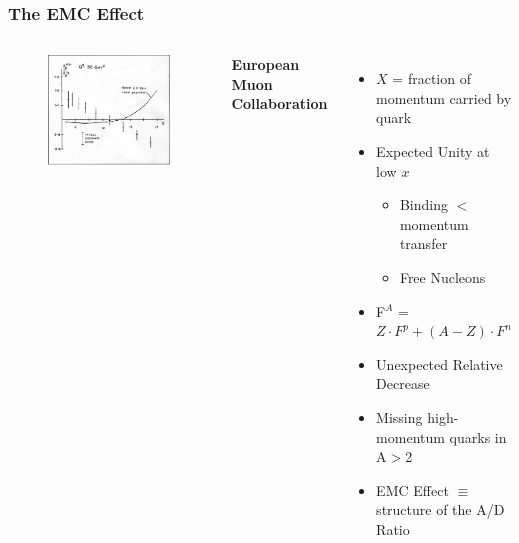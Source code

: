 \documentclass[12pt,usenames,dvipsnames]{beamer}
\begin{document}
\begin{frame}
\frametitle{The EMC Effect}
\begin{columns}[t]
	\vspace{-35pt}
	\begin{figure}
		\includegraphics[width =7cm]{../images/Thesis/EMC.png}
		\caption*{\cite{cc}}
	\end{figure}
	
	\vspace{-1.25cm}	\hspace{-20pt}\textbf{ European Muon Collaboration}
	
	\begin{itemize}
		\item \small$X$ = fraction of momentum carried by quark	
				\pause
		\item Expected Unity at low $x$ 
				\pause
		\begin{itemize}
			\item Binding $<$ momentum transfer
			\item Free Nucleons
		\end{itemize}

		\item F$^A$ = $Z \cdot F^p + (A-Z)\cdot F^n$  
		\pause
		\item Unexpected Relative Decrease
		\item Missing high-momentum quarks in A$>$2
		\pause
		\item EMC Effect $\equiv$ structure of the A/D Ratio
	\end{itemize}
	
\end{columns}
\end{frame}
\end{document}
